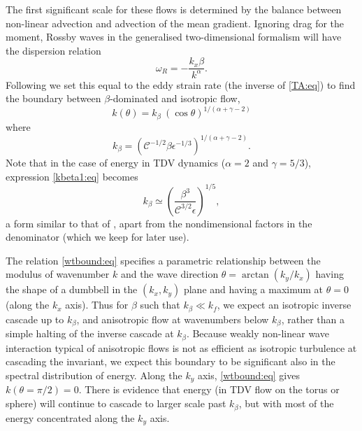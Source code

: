 \documentclass{jfm}
\newcommand{\ca}  [1]{\mathcal{#1}}
\begin{document}
The first significant scale for these flows is determined by the
balance between non-linear advection and advection of the mean
gradient.  Ignoring drag for the moment, Rossby waves in the
generalised two-dimensional formalism will have the dispersion
relation
\begin{equation}
\omega_R = -\frac{k_x\beta}{k^{\alpha}}.
\label{rossby:eq}
\end{equation}
Following \citet*{Vallis93a} we set this equal to the eddy strain rate
(the inverse of \ref{TA:eq}) to find the boundary between
$\beta$-dominated and isotropic flow,
\begin{equation}
k(\theta) = k_{\beta}~(\cos \theta)^{1/(\alpha+\gamma-2)}
\label{wtbound:eq}
\end{equation}
where
\begin{equation}
k_{\beta} = (\ca{C}^{-1/2}\beta\epsilon^{-1/3})
^{1/(\alpha+\gamma-2)}.
\label{kbeta1:eq}
\end{equation}
Note that in the case of energy in TDV dynamics
($\alpha=2$ and $\gamma=5/3$), expression \eqref{kbeta1:eq} becomes
\begin{equation}
k_{\beta} \simeq \left(\frac{\beta^3}{\ca{C}^{3/2}\epsilon}\right)^{1/5},
\label{kbetavm:eq}
\end{equation}
a form similar to that of \citet*{Vallis93a}, apart from the
nondimensional factors in the denominator (which we keep for later
use).

The relation \eqref{wtbound:eq} specifies a parametric relationship
between the modulus of wavenumber $k$ and the wave direction $\theta =
\arctan(k_y/k_x)$ having the shape of a dumbbell in the $(k_x,k_y)$
plane and having a maximum at $\theta=0$ (along the $k_x$ axis).  Thus
for $\beta$ such that $k_{\beta}\ll k_f$, we expect an isotropic
inverse cascade up to $k_{\beta}$, and anisotropic flow at wavenumbers
below $k_{\beta}$, rather than a simple halting of the inverse cascade
at $k_{\beta}$.  Because weakly non-linear wave interaction typical of
anisotropic flows is not as efficient as isotropic turbulence at
cascading the invariant, we expect this boundary to be significant
also in the spectral distribution of energy.  Along the $k_y$ axis,
\eqref{wtbound:eq} gives $k(\theta=\pi/2)=0$.  There is evidence
\citep{Vallis93b,chekhlov96,smithwaleffe99, huang01} that energy (in
TDV flow on the torus or sphere) will continue to cascade to larger
scale past $k_{\beta}$, but with most of the energy concentrated along
the $k_y$ axis.
\end{document}
